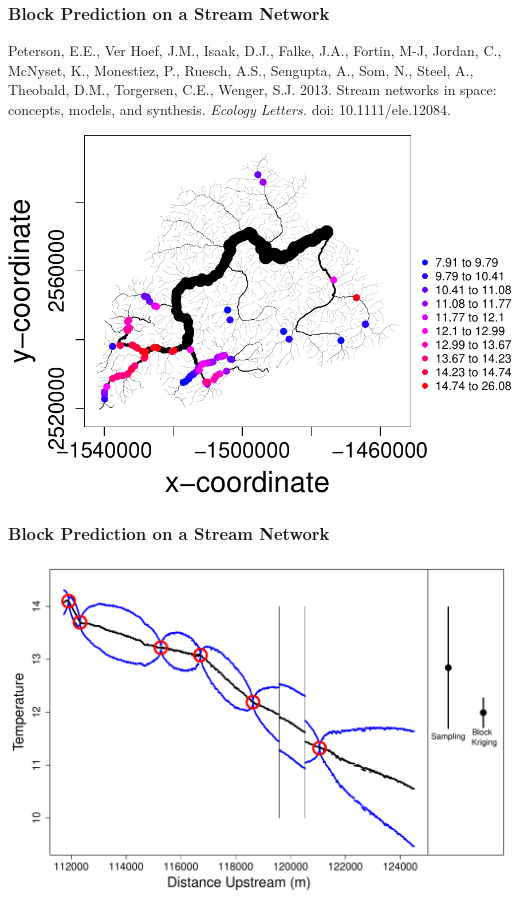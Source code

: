 \documentclass[mathserif,compress]{beamer}\usepackage{graphicx, color}
\makeatletter
\def\maxwidth{ %
  \ifdim\Gin@nat@width>\linewidth
    \linewidth
  \else
    \Gin@nat@width
  \fi
}
\makeatother
\begin{document}
\begin{frame}[fragile]
\frametitle{Block Prediction on a Stream Network}

	\scriptsize
	Peterson, E.E., Ver Hoef, J.M., Isaak, D.J., Falke, J.A., Fortin, M-J, Jordan, C., McNyset, K., Monestiez, P., Ruesch, A.S., Sengupta, A., Som, N., Steel, A., Theobald, D.M., Torgersen, C.E., Wenger, S.J. 2013. Stream networks in space: concepts, models, and synthesis. {\it Ecology Letters.} doi: 10.1111/ele.12084.
	\begin{center}
		\includegraphics[width=.6\maxwidth]{figure/mf04pTempColoredCrop}
	\end{center}
\end{frame}


\begin{frame}[fragile]
\frametitle{Block Prediction on a Stream Network}
	
	\includegraphics[width=.95\maxwidth]{figure/Figure_BlockKriging120203}

\end{frame}
\end{document}
